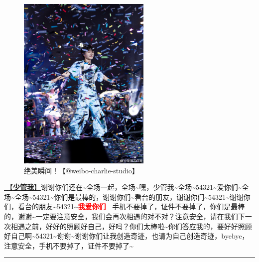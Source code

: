 \documentclass[]{ctexbook}
\begin{document}
\begin{figure}

{\centering \includegraphics[width=180pt]{img/hangzhou20240824/001} 

}

\caption{绝美瞬间！【@weibo-charlie-studio】}\label{fig:unnamed-chunk-73}
\end{figure}

\hyperref[watch-ur-manners]{🎵【\textbf{少管我}】}谢谢你们还在\textasciitilde 全场一起，全场\textasciitilde 嘿，少管我\textasciitilde 全场\textasciitilde54321\textasciitilde 爱你们\textasciitilde 全场\textasciitilde 全场\textasciitilde54321\textasciitilde 你们是最棒的，谢谢你们\textasciitilde 看台的朋友，谢谢你们\textasciitilde54321\textasciitilde 谢谢你们，看台的朋友\textasciitilde54321\textasciitilde{}\textbf{\textcolor{red}{我爱你们~} } 手机不要掉了，证件不要掉了，你们是最棒的，谢谢\textasciitilde 一定要注意安全，我们会再次相遇的对不对？注意安全，请在我们下一次相遇之前，好好的照顾好自己，好吗？你们太棒啦\textasciitilde 你们答应我的，要好好照顾好自己啊\textasciitilde54321\textasciitilde 谢谢\textasciitilde 谢谢你们让我创造奇迹，也请为自己创造奇迹，byebye，注意安全，手机不要掉了，证件不要掉了\textasciitilde{}

\begin{center}\rule{0.5\linewidth}{0.5pt}\end{center}
\end{document}
